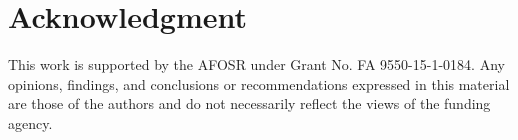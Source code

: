 \documentclass[10pt, conference, compsocconf]{IEEEtran}
\begin{document}
\section*{Acknowledgment}
\noindent
This work is supported by the AFOSR under Grant No. FA 9550-15-1-0184. Any opinions, findings, and conclusions or recommendations expressed in this material are those of the authors and do not necessarily reflect the views of the funding agency. %







%
%
%



%


\end{document}
